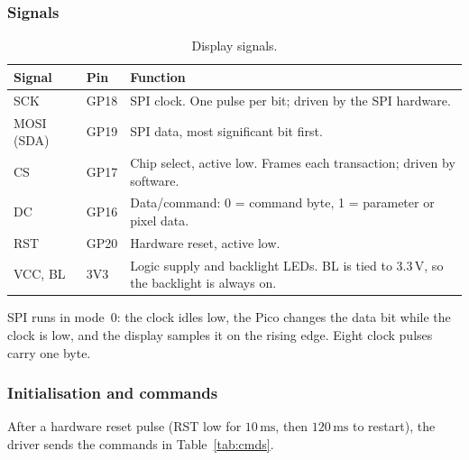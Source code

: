 \documentclass[11pt,a4paper]{article}
\newcommand{\unit}[2]{\ensuremath{#1\,\mathrm{#2}}}
\begin{document}
\subsubsection{Signals}
\begin{table}[H]
\centering
\caption{Display signals.}\label{tab:lcdsig}
\begin{tabularx}{\linewidth}{llX}
\toprule
\textbf{Signal} & \textbf{Pin} & \textbf{Function} \\
\midrule
SCK & GP18 & SPI clock. One pulse per bit; driven by the SPI hardware. \\
MOSI (SDA) & GP19 & SPI data, most significant bit first. \\
CS & GP17 & Chip select, active low. Frames each transaction; driven by software. \\
DC & GP16 & Data/command: 0 = command byte, 1 = parameter or pixel data. \\
RST & GP20 & Hardware reset, active low. \\
VCC, BL & 3V3 & Logic supply and backlight LEDs. BL is tied to 3.3\,V, so the backlight is always on. \\
\bottomrule
\end{tabularx}
\end{table}

\noindent SPI runs in mode~0: the clock idles low, the Pico changes the data bit
while the clock is low, and the display samples it on the rising edge. Eight
clock pulses carry one byte.

\subsubsection{Initialisation and commands}
After a hardware reset pulse (RST low for \unit{10}{ms}, then \unit{120}{ms} to
restart), the driver sends the commands in Table~\ref{tab:cmds}.
\end{document}

